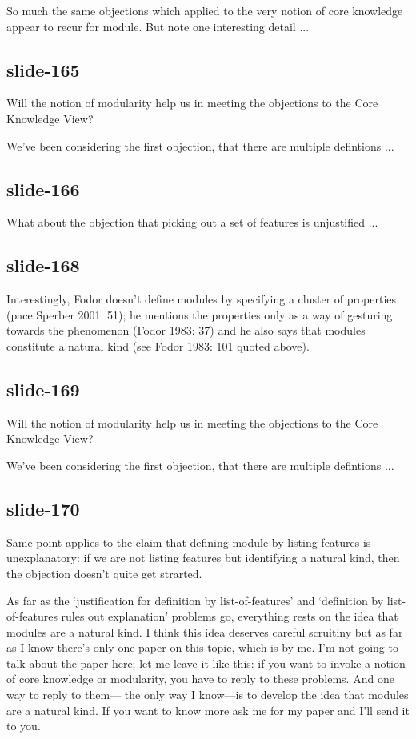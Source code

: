 \documentclass[12pt,\papersize]{extarticle}
\begin{document}
So much the same objections which applied to the very notion of core knowledge
appear to recur for module.  But note one interesting detail ...

\subsection{slide-165}
Will the notion of modularity help us in meeting the objections to the Core Knowledge View?

We’ve been considering the first objection, that there are multiple defintions ...

\subsection{slide-166}
What about the objection that picking out a set of features is unjustified ...

\subsection{slide-168}
Interestingly, Fodor doesn't define modules by specifying a cluster of properties
(pace Sperber 2001: 51); he mentions the properties only as a way of gesturing towards
the phenomenon (Fodor 1983: 37) and he also says that modules constitute a natural kind
(see Fodor 1983: 101 quoted above).

\subsection{slide-169}
Will the notion of modularity help us in meeting the objections to the Core Knowledge View?

We’ve been considering the first objection, that there are multiple defintions ...

\subsection{slide-170}
Same point applies to the claim that defining module by listing features is
unexplanatory: if we are not listing features but identifying a natural kind,
then the objection doesn’t quite get strarted.

As far as the
‘justification for definition by list-of-features’ and
‘definition by list-of-features rules out explanation’ problems go,
everything rests on the idea that modules are a natural kind.
I think this idea deserves careful scruitiny but as far as I know there's
only one paper on this topic, which is by me.
I'm not going to talk about the paper here; let me leave it like this:
if you want to invoke a notion of core knowledge or modularity,
you have to reply to these problems.  And one way to reply to them---
the only way I know---is to develop the idea that modules are a natural
kind.  If you want to know more ask me for my paper and I'll send it to you.
\end{document}
